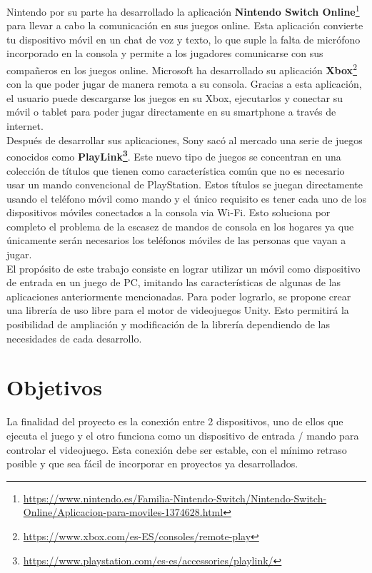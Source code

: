Nintendo por su parte ha desarrollado la aplicaci\'on \textbf{Nintendo Switch Online}\footnote{\url{https://www.nintendo.es/Familia-Nintendo-Switch/Nintendo-Switch-Online/Aplicacion-para-moviles-1374628.html}} para llevar a cabo la comunicaci\'on en sus juegos online. Esta aplicaci\'on convierte tu dispositivo m\'ovil en un chat de voz y texto, lo que suple la falta de micr\'ofono incorporado en la consola y permite a los jugadores comunicarse con sus compa\~neros en los juegos online. Microsoft ha desarrollado su aplicaci\'on \textbf{Xbox}\footnote{\url{https://www.xbox.com/es-ES/consoles/remote-play}} con la que poder jugar de manera remota a su consola. Gracias a esta aplicaci\'on, el usuario puede descargarse los juegos en su Xbox, ejecutarlos y conectar su m\'ovil o tablet para poder jugar directamente en su smartphone a trav\'es de internet.\\

Despu\'es de desarrollar sus aplicaciones, Sony sac\'o al mercado una serie de juegos conocidos como \textbf{PlayLink\footnote{\url{https://www.playstation.com/es-es/accessories/playlink/}}}. Este nuevo tipo de juegos se concentran en una colecci\'on de t\'itulos que tienen como caracter\'istica com\'un que no es necesario usar un mando convencional de PlayStation. Estos t\'itulos se juegan directamente usando el tel\'efono m\'ovil como mando y el \'unico requisito es tener cada uno de los dispositivos m\'oviles conectados a la consola via Wi-Fi. Esto soluciona por completo el problema de la escasez de mandos de consola en los hogares ya que \'unicamente ser\'an necesarios los tel\'efonos m\'oviles de las personas que vayan a jugar.\\

El prop\'osito de este trabajo consiste en lograr utilizar un m\'ovil como dispositivo de entrada en un juego de PC, imitando las caracter\'isticas de algunas de las aplicaciones anteriormente mencionadas. Para poder lograrlo, se propone crear una librer\'ia de uso libre para el motor de videojuegos Unity. Esto permitir\'a la posibilidad de ampliaci\'on y modificaci\'on de la librer\'ia dependiendo de las necesidades de cada desarrollo.


\section{Objetivos}

La finalidad del proyecto es la conexi\'on entre 2 dispositivos, uno de ellos que ejecuta el juego y el otro funciona como un dispositivo de entrada / mando para controlar el videojuego. Esta conexi\'on debe ser estable, con el m\'inimo retraso posible y que sea f\'acil de incorporar en proyectos ya desarrollados.\\

